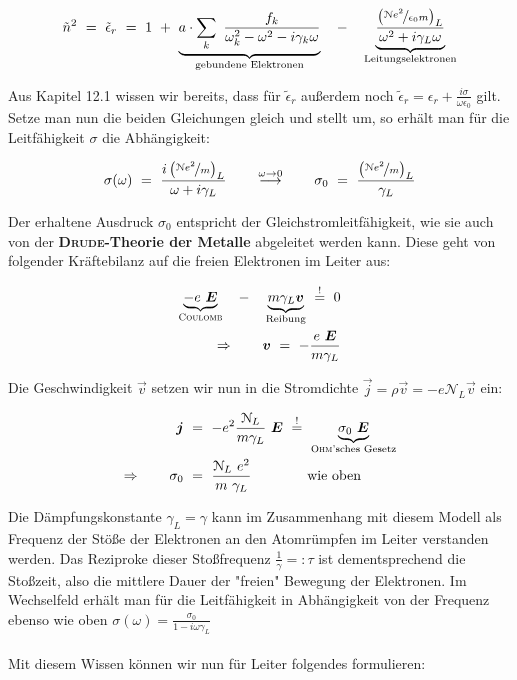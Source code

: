 \begin{equation*}
\tilde{n}^2  \ = \ \tilde{\epsilon}_r  \ = \ 1 \ + \ \underbrace{a\cdot\sum_k \ \frac{f_k}{\omega_k^2 - \omega^2 - i \gamma_k\omega}}_{\text{gebundene Elektronen}} \quad - \quad \underbrace{\frac{\left(\nicefrac{\mathcal{N}e^2}{\epsilon_0m}\right)_L}{\omega^2 + i\gamma_L\omega}}_{\text{Leitungselektronen}}
\end{equation*}

Aus Kapitel 12.1 wissen wir bereits, dass für $\tilde{\epsilon}_r$ außerdem noch $\tilde{\epsilon}_r = \epsilon_r + \frac{i\sigma}{\omega\epsilon_0}$ gilt. Setze man nun die beiden Gleichungen gleich und stellt um, so erhält man für die Leitfähigkeit $\sigma$ die Abhängigkeit:

\begin{equation*}
\sigma(\omega) \ = \ \frac{i\left(\nicefrac{\mathcal{N}e^2}{m}\right)_L}{\omega + i \gamma_L} \qquad \overset{\omega\rightarrow0}{\longrightarrow}\qquad \sigma_0  \ = \ \frac{\left(\nicefrac{\mathcal{N}e^2}{m}\right)_L}{\gamma_L}	
\end{equation*}

Der erhaltene Ausdruck $\sigma_0$ entspricht der Gleichstromleitfähigkeit, wie sie auch von der \textbf{\textsc{Drude}-Theorie der Metalle} abgeleitet werden kann. Diese geht von folgender Kräftebilanz auf die freien Elektronen im Leiter aus:

\begin{align*}
\underbrace{-e\ \vec{E}}_{\textsc{Coulomb}} \quad - \quad \underbrace{m \gamma_L\vec{v}}_{\text{Reibung}}  \ \overset{!}{=} \ 0\\
\Rightarrow \qquad \vec{v}  \ = \  -\frac{e \ \vec{E}}{m \gamma_L} 
\end{align*}

Die Geschwindigkeit $\vec{v}$ setzen wir nun in die Stromdichte $\vec{j} = \rho\vec{v} = -e \mathcal{N}_L \vec{v}$ ein:

\begin{align*}
\vec{j}  \ &= \ -e^2 \frac{\mathcal{N}_L}{m\gamma_L} \ \vec{E} \ \overset{!}{=} \ \underbrace{\sigma_0 \ \vec{E}}_{\text{\textsc{Ohm}'sches Gesetz}}\\
\Rightarrow \qquad \sigma_0  \ &= \ \frac{\mathcal{N}_L \ e^2}{m \ \gamma_L} \qquad\qquad\text{wie oben}
\end{align*}

Die Dämpfungskonstante $\gamma_L = \gamma$ kann im Zusammenhang mit diesem Modell als Frequenz der Stöße der Elektronen an den Atomrümpfen im Leiter verstanden werden. Das Reziproke dieser Stoßfrequenz $\frac{1}{\gamma}=: \tau$  ist dementsprechend die Stoßzeit, also die mittlere Dauer der "freien" Bewegung der Elektronen. Im Wechselfeld erhält man für die Leitfähigkeit in Abhängigkeit von der Frequenz ebenso wie oben $\sigma(\omega) = \frac{\sigma_0}{1-i\omega\gamma_L}$\\
\ \\
Mit diesem Wissen können wir nun für Leiter folgendes formulieren:

